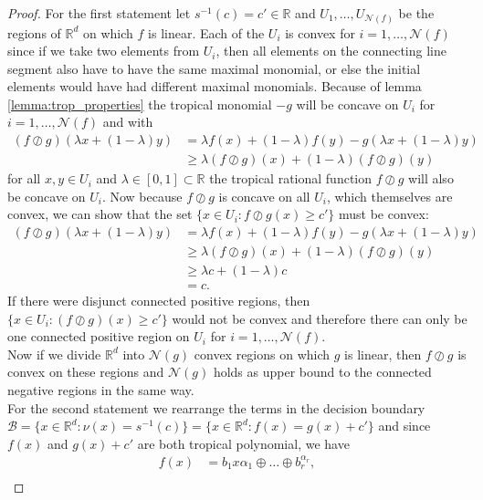 \documentclass{article}
\theoremstyle{definition}
\begin{document}
\begin{proof}
For the first statement let $s^{-1}(c)=c' \in \mathbb{R}$ and $U_1 , \dots , U_{\mathcal{N}(f)}$ be the regions of $\mathbb{R}^{d}$ on which $f$ is linear. Each of the $U_i$ is convex for $i=1 , \dots , \mathcal{N}(f)$ since if we take two elements from $U_i$, then all elements on the connecting line segment also have to have the same maximal monomial, or else the initial elements would have had different maximal monomials. Because of lemma \ref{lemma:trop_properties} the tropical monomial $-g$ will be concave on $U_i$ for $i = 1, \dots , \mathcal{N}(f)$ and with
\begin{align*}
(f \oslash g) (\lambda x + (1-\lambda)y)
&= \lambda f(x) + (1-\lambda) f(y) - g(\lambda x + (1-\lambda)y) \\
&\geq \lambda (f \oslash g)(x) + (1-\lambda) (f \oslash g) (y)
\end{align*}
for all $x, y \in U_i$ and $\lambda \in [0,1] \subset \mathbb{R}$ the tropical rational function $f \oslash g$ will also be concave on $U_i$. Now because $f \oslash g$ is concave on all $U_i$, which themselves are convex, we can show that the set $\{x \in U_i : f \oslash g(x) \geq c'\}$ must be convex:
\begin{align*}
(f \oslash g) (\lambda x + (1-\lambda)y)
&= \lambda f(x) + (1-\lambda) f(y) - g(\lambda x + (1-\lambda)y) \\
&\geq \lambda (f \oslash g)(x) + (1-\lambda) (f \oslash g) (y) \\
&\geq \lambda c + (1-\lambda)c \\
&= c.
\end{align*}
If there were disjunct connected positive regions, then $\{ x \in U_i : (f \oslash g)(x) \geq c' \}$ would not be convex and therefore there can only be one connected positive region on $U_i$ for $i = 1, \dots , \mathcal{N}(f)$. \\
Now if we divide $\mathbb{R}^{d}$ into $\mathcal{N}(g)$ convex regions on which $g$ is linear, then $f \oslash g$ is convex on these regions and $\mathcal{N}(g)$ holds as upper bound to the connected negative regions in the same way. \\
For the second statement we rearrange the terms in the decision boundary $\mathcal{B} = \{ x \in \mathbb{R}^{d} : \nu(x) = s^{-1}(c) \} = \{ x \in \mathbb{R}^{d} : f(x) = g(x) + c' \}$ and since $f(x)$ and $g(x) + c'$ are both tropical polynomial, we have
\begin{align*}
f(x) &= b_1 x{\alpha_1} \oplus \dots \oplus b_r^{\alpha_r}, \\

\end{align*}
\end{proof}
\end{document}
